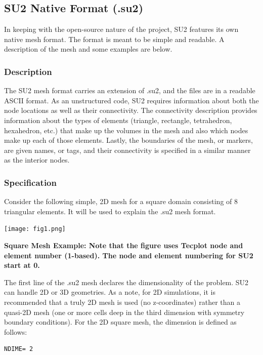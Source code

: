 \documentclass{article}
\begin{document}
\subsection{SU2 Native Format (.su2)}
In keeping with the open-source nature of the project, SU2 features its own native mesh format. The format is meant to be simple and readable. A description of the mesh and some examples are below.

\subsubsection{Description}

The SU2 mesh format carries an extension of .su2, and the files are in a readable ASCII format. As an unstructured code, SU2 requires information about both the node locations as well as their connectivity. The connectivity description provides information about the types of elements (triangle, rectangle, tetrahedron, hexahedron, etc.) that make up the volumes in the mesh and also which nodes make up each of those elements. Lastly, the boundaries of the mesh, or markers, are given names, or tags, and their connectivity is specified in a similar manner as the interior nodes.

\subsubsection{Specification}

Consider the following simple, 2D mesh for a square domain consisting of 8 triangular elements. It will be used to explain the .su2 mesh format.

\begin{center}
    \texttt{[image: fig1.png]}
\end{center}

\textbf{Square Mesh Example: Note that the figure uses Tecplot node and element number (1-based). The node and element numbering for SU2 start at 0.}

The first line of the .su2 mesh declares the dimensionality of the problem. SU2 can handle 2D or 3D geometries. As a note, for 2D simulations, it is recommended that a truly 2D mesh is used (no z-coordinates) rather than a quasi-2D mesh (one or more cells deep in the third dimension with symmetry boundary conditions). For the 2D square mesh, the dimension is defined as follows:

\begin{lstlisting}
NDIME= 2
\end{lstlisting}
\end{document}
